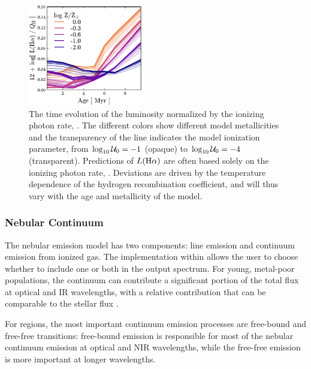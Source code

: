 \begin{figure}[!htbp]
  \begin{centering}
    \includegraphics[width=0.45\textwidth]{manuscript/chapter2/f9.pdf}
    \caption{The time evolution of the \ha{} luminosity normalized by the ionizing photon rate, \QH{}. The different colors show different model metallicities and the transparency of the line indicates the model ionization parameter, from $\log_{10} \mathcal{U}_0=-1$ (opaque) to $\log_{10} \mathcal{U}_0=-4$ (transparent). Predictions of $L(\mathrm{H\alpha})$ are often based solely on the ionizing photon rate, \QH{}. Deviations are driven by the temperature dependence of the hydrogen recombination coefficient, and will thus vary with the age and metallicity of the model.}
    \label{fig:RecLines}
  \end{centering}
\end{figure}

\subsubsection{Nebular Continuum}\label{sec:models:continuum}

The nebular emission model has two components: line emission and continuum emission from ionized gas. The implementation within \FSPS allows the user to choose whether to include one or both in the output spectrum. For young, metal-poor populations, the continuum can contribute a significant portion of the total flux at optical and IR wavelengths, with a relative contribution that can be comparable to the stellar flux \citep[e.g.,][]{Reines10}. 

For \hii regions, the most important continuum emission processes are free-bound and free-free transitions: free-bound emission is responsible for most of the nebular continuum emission at optical and NIR wavelengths, while the free-free emission is more important at longer wavelengths. 

